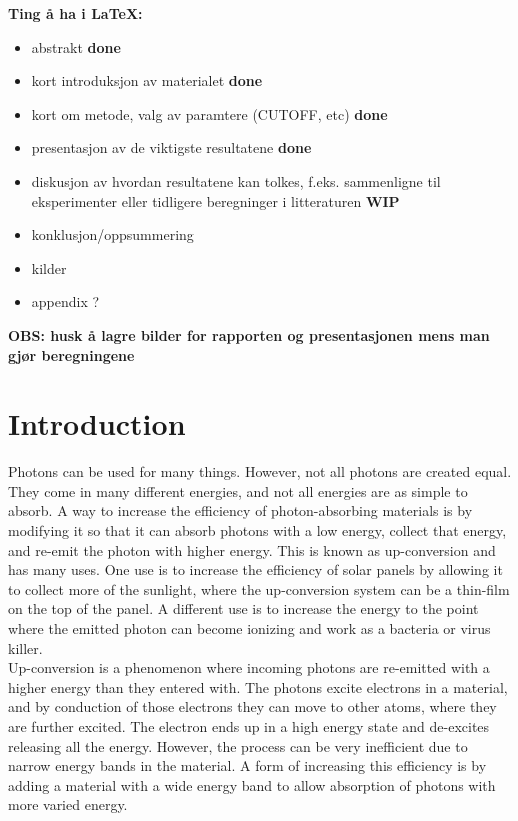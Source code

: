 \documentclass{article}
\begin{document}

\textbf{Ting å ha i \LaTeX:}
\begin{itemize}
    \item abstrakt
    \subitem \textbf{done}
    \item kort introduksjon av materialet
    \subitem \textbf{done}
    \item kort om metode, valg av paramtere (CUTOFF, etc)
    \subitem \textbf{done}
    \item presentasjon av de viktigste resultatene
    \subitem \textbf{done}
    \item diskusjon av hvordan resultatene kan tolkes, f.eks. sammenligne til eksperimenter eller tidligere beregninger i litteraturen
    \subitem \textbf{WIP}
    \item konklusjon/oppsummering
    \item kilder
    \item appendix ?
\end{itemize}

\vspace{1cm}

\textbf{\large{OBS: husk å lagre bilder for rapporten og presentasjonen mens man gjør beregningene}}

\section{Introduction}  \label{sec:Introduction}

    Photons can be used for many things. However, not all photons are created equal. They come in many different energies, and not all energies are as simple to absorb. A way to increase the efficiency of photon-absorbing materials is by modifying it so that it can absorb photons with a low energy, collect that energy, and re-emit the photon with higher energy. This is known as up-conversion and has many uses. One use is to increase the efficiency of solar panels by allowing it to collect more of the sunlight, where the up-conversion system can be a thin-film on the top of the panel. A different use is to increase the energy to the point where the emitted photon can become ionizing and work as a bacteria or virus killer.\\

    Up-conversion is a phenomenon where incoming photons are re-emitted with a higher energy than they entered with. The photons excite electrons in a material, and by conduction of those electrons they can move to other atoms, where they are further excited. The electron ends up in a high energy state and de-excites releasing all the energy. However, the process can be very inefficient due to narrow energy bands in the material. A form of increasing this efficiency is by adding a material with a wide energy band to allow absorption of photons with more varied energy.\\
\end{document}
